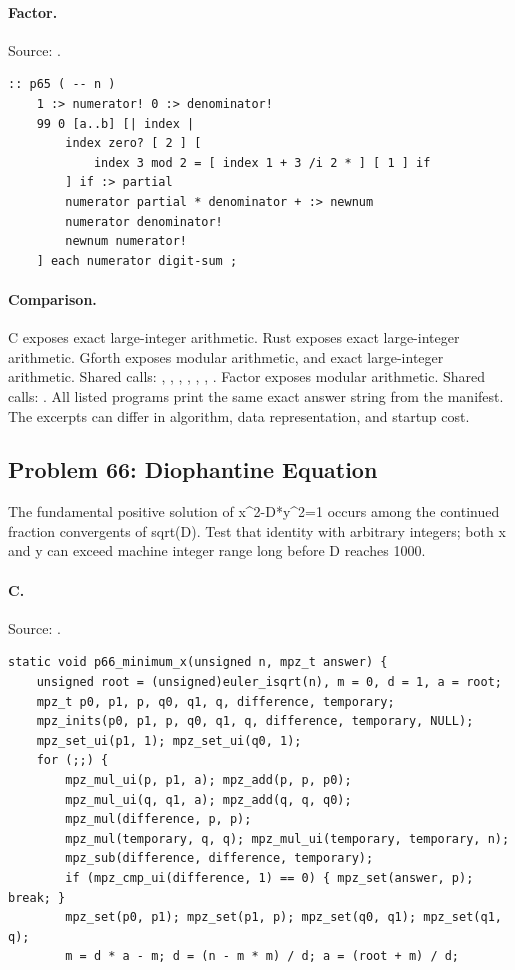 \paragraph{Factor.} Source: .
\begin{lstlisting}
:: p65 ( -- n )
    1 :> numerator! 0 :> denominator!
    99 0 [a..b] [| index |
        index zero? [ 2 ] [
            index 3 mod 2 = [ index 1 + 3 /i 2 * ] [ 1 ] if
        ] if :> partial
        numerator partial * denominator + :> newnum
        numerator denominator!
        newnum numerator!
    ] each numerator digit-sum ;
\end{lstlisting}

\paragraph{Comparison.}
C exposes exact large-integer arithmetic. Rust exposes exact large-integer arithmetic. Gforth exposes modular arithmetic, and exact large-integer arithmetic. Shared calls: \texttt{}, \texttt{}, \texttt{}, \texttt{}, \texttt{}, \texttt{}, \texttt{}. Factor exposes modular arithmetic. Shared calls: \texttt{}.
All listed programs print the same exact answer string from the manifest. The excerpts can differ in algorithm, data representation, and startup cost.

\subsection{Problem 66: Diophantine Equation}
\label{walkthrough:p66}
The fundamental positive solution of x\textasciicircum{}2-D*y\textasciicircum{}2=1 occurs among the continued fraction convergents of sqrt(D). Test that identity with arbitrary integers; both x and y can exceed machine integer range long before D reaches 1000.

\paragraph{C.} Source: .
\begin{lstlisting}
static void p66_minimum_x(unsigned n, mpz_t answer) {
    unsigned root = (unsigned)euler_isqrt(n), m = 0, d = 1, a = root;
    mpz_t p0, p1, p, q0, q1, q, difference, temporary;
    mpz_inits(p0, p1, p, q0, q1, q, difference, temporary, NULL);
    mpz_set_ui(p1, 1); mpz_set_ui(q0, 1);
    for (;;) {
        mpz_mul_ui(p, p1, a); mpz_add(p, p, p0);
        mpz_mul_ui(q, q1, a); mpz_add(q, q, q0);
        mpz_mul(difference, p, p);
        mpz_mul(temporary, q, q); mpz_mul_ui(temporary, temporary, n);
        mpz_sub(difference, difference, temporary);
        if (mpz_cmp_ui(difference, 1) == 0) { mpz_set(answer, p); break; }
        mpz_set(p0, p1); mpz_set(p1, p); mpz_set(q0, q1); mpz_set(q1, q);
        m = d * a - m; d = (n - m * m) / d; a = (root + m) / d;
\end{lstlisting}

